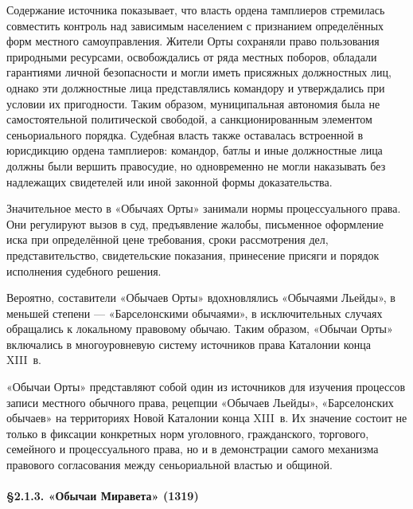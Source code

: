 Содержание источника показывает, что власть ордена тамплиеров стремилась совместить контроль над зависимым населением с признанием определённых форм местного самоуправления. Жители Орты сохраняли право пользования природными ресурсами, освобождались от ряда местных поборов, обладали гарантиями личной безопасности и могли иметь присяжных должностных лиц, однако эти должностные лица представлялись командору и утверждались при условии их пригодности. Таким образом, муниципальная автономия была не самостоятельной политической свободой, а санкционированным элементом сеньориального порядка. Судебная власть также оставалась встроенной в юрисдикцию ордена тамплиеров: командор, батлы и иные должностные лица должны были вершить правосудие, но одновременно не могли наказывать без надлежащих свидетелей или иной законной формы доказательства.

Значительное место в «Обычаях Орты» занимали нормы процессуального права. Они регулируют вызов в суд, предъявление жалобы, письменное оформление иска при определённой цене требования, сроки рассмотрения дел, представительство, свидетельские показания, принесение присяги и порядок исполнения судебного решения.

Вероятно, составители «Обычаев Орты» вдохновлялись «Обычаями Льейды», в меньшей степени --- «Барселонскими обычаями», в исключительных случаях обращались к локальному правовому обычаю. Таким образом, «Обычаи Орты» включались в многоуровневую систему источников права Каталонии конца XIII~в.

«Обычаи Орты» представляют собой один из источников для изучения процессов записи местного обычного права, рецепции «Обычаев Льейды», «Барселонских обычаев» на территориях Новой Каталонии конца XIII~в. Их значение состоит не только в фиксации конкретных норм уголовного, гражданского, торгового, семейного и процессуального права, но и в демонстрации самого механизма правового согласования между сеньориальной властью и общиной.

\paragraph*{§2.1.3. «Обычаи Миравета» (1319)}

